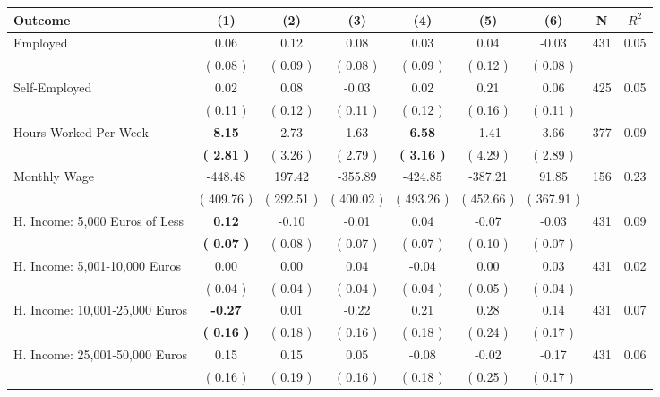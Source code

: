 \begin{tabular}{lcccccccc}
\toprule
 \textbf{Outcome} & \textbf{(1)} & \textbf{(2)} & \textbf{(3)} & \textbf{(4)} & \textbf{(5)} & \textbf{(6)} & \textbf{N} & \textbf{$ R^2$} \\
\midrule
Employed &      0.06 &      0.12 &      0.08 &      0.03 &      0.04 &     -0.03 & 431 &       0.05 \\ 
 & (     0.08 ) & (     0.09 ) & (     0.08 ) & (     0.09 ) & (     0.12 ) & (     0.08 ) & \\
Self-Employed &      0.02 &      0.08 &     -0.03 &      0.02 &      0.21 &      0.06 & 425 &       0.05 \\ 
 & (     0.11 ) & (     0.12 ) & (     0.11 ) & (     0.12 ) & (     0.16 ) & (     0.11 ) & \\
Hours Worked Per Week & \textbf{     8.15} &      2.73 &      1.63 & \textbf{     6.58} &     -1.41 &      3.66 & 377 &       0.09 \\ 
 & \textbf{(     2.81 )} & (     3.26 ) & (     2.79 ) & \textbf{(     3.16 )} & (     4.29 ) & (     2.89 ) & \\
Monthly Wage &   -448.48 &    197.42 &   -355.89 &   -424.85 &   -387.21 &     91.85 & 156 &       0.23 \\ 
 & (   409.76 ) & (   292.51 ) & (   400.02 ) & (   493.26 ) & (   452.66 ) & (   367.91 ) & \\
H. Income: 5,000 Euros of Less & \textbf{     0.12} &     -0.10 &     -0.01 &      0.04 &     -0.07 &     -0.03 & 431 &       0.09 \\ 
 & \textbf{(     0.07 )} & (     0.08 ) & (     0.07 ) & (     0.07 ) & (     0.10 ) & (     0.07 ) & \\
H. Income: 5,001-10,000 Euros &      0.00 &      0.00 &      0.04 &     -0.04 &      0.00 &      0.03 & 431 &       0.02 \\ 
 & (     0.04 ) & (     0.04 ) & (     0.04 ) & (     0.04 ) & (     0.05 ) & (     0.04 ) & \\
H. Income: 10,001-25,000 Euros & \textbf{    -0.27} &      0.01 &     -0.22 &      0.21 &      0.28 &      0.14 & 431 &       0.07 \\ 
 & \textbf{(     0.16 )} & (     0.18 ) & (     0.16 ) & (     0.18 ) & (     0.24 ) & (     0.17 ) & \\
H. Income: 25,001-50,000 Euros &      0.15 &      0.15 &      0.05 &     -0.08 &     -0.02 &     -0.17 & 431 &       0.06 \\ 
 & (     0.16 ) & (     0.19 ) & (     0.16 ) & (     0.18 ) & (     0.25 ) & (     0.17 ) & \\

\end{tabular}
